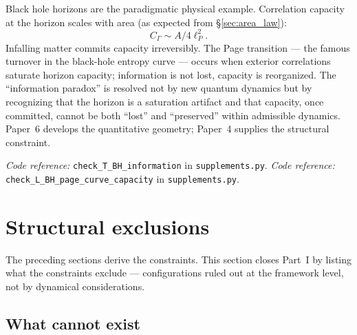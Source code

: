 \documentclass[11pt]{article}
\newcommand{\coderef}[2]{\smallskip\noindent\textit{Code reference:} \texttt{#1} in \texttt{#2}.}
\theoremstyle{definition}
\begin{document}
Black hole horizons are the paradigmatic physical example. Correlation capacity at the horizon scales with area (as expected from \S\ref{sec:area_law}):
\[
C_\Gamma \sim A/4\ell_P^2.
\]
Infalling matter commits capacity irreversibly. The Page transition --- the famous turnover in the black-hole entropy curve --- occurs when exterior correlations saturate horizon capacity; information is not lost, capacity is reorganized. The ``information paradox'' is resolved not by new quantum dynamics but by recognizing that the horizon is a saturation artifact and that capacity, once committed, cannot be both ``lost'' and ``preserved'' within admissible dynamics. Paper~6 develops the quantitative geometry; Paper~4 supplies the structural constraint.

\coderef{check\_T\_BH\_information}{supplements.py}
\coderef{check\_L\_BH\_page\_curve\_capacity}{supplements.py}

\clearpage

\section{Structural exclusions}\label{sec:exclusions}

The preceding sections derive the constraints. This section closes Part~I by listing what the constraints exclude --- configurations ruled out at the framework level, not by dynamical considerations.

\subsection{What cannot exist}\label{sec:exclusions_cannot_exist}
\end{document}
